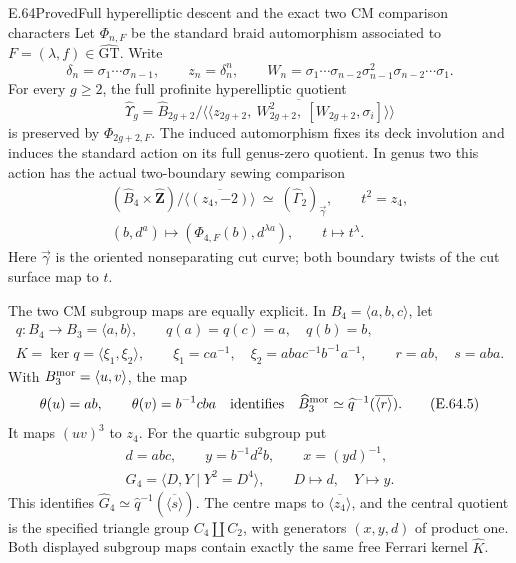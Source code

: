 \begin{statement}{E.64}{Proved}{Full hyperelliptic descent and the exact two CM comparison characters}
Let $\Phi_{n,F}$ be the standard braid automorphism associated to
$F=(\lambda,f)\in\widehat{\mathrm{GT}}$.  Write
\[
 \delta_n=\sigma_1\cdots\sigma_{n-1},\qquad z_n=\delta_n^n,
 \qquad
 W_n=\sigma_1\cdots\sigma_{n-2}\sigma_{n-1}^2
                         \sigma_{n-2}\cdots\sigma_1.
 \tag{E.64.1}
\]
For every $g\geq2$, the full profinite hyperelliptic quotient
\[
 \widehat\Upsilon_g=
 \widehat B_{2g+2}/
 \overline{\langle\!\langle
 z_{2g+2},\ W_{2g+2}^2,\ [W_{2g+2},\sigma_i]
 \rangle\!\rangle}
 \tag{E.64.2}
\]
is preserved by $\Phi_{2g+2,F}$.  The induced automorphism fixes its
deck involution and induces the standard action on its full
genus-zero quotient.  In genus two this action has the actual
two-boundary sewing comparison
\[
 \begin{gathered}
 (\widehat B_4\times\widehat{\mathbf Z})/
                   \overline{\langle(z_4,-2)\rangle}
       \ \simeq\ (\widehat\Gamma_2)_{\vec\gamma},
       \qquad t^2=z_4,\\
 (b,d^a)\longmapsto
                (\Phi_{4,F}(b),d^{\lambda a}),
       \qquad t\longmapsto t^\lambda .
 \end{gathered}
 \tag{E.64.3}
\]
Here $\vec\gamma$ is the oriented nonseparating cut curve; both
boundary twists of the cut surface map to $t$.

The two CM subgroup maps are equally explicit.  In
$B_4=\langle a,b,c\rangle$, let
\[
 \begin{gathered}
 q:B_4\longrightarrow B_3=\langle a,b\rangle,
       \qquad q(a)=q(c)=a,\quad q(b)=b,\\
 K=\ker q=\langle\xi_1,\xi_2\rangle,\qquad
 \xi_1=ca^{-1},\quad
 \xi_2=aba c^{-1}b^{-1}a^{-1},\qquad r=ab,
       \quad s=aba .
 \end{gathered}
 \tag{E.64.4}
\]
With $B_3^{\rm mor}=\langle u,v\rangle$, the map
\[
 \theta(u)=ab,\qquad \theta(v)=b^{-1}cba
 \quad\text{identifies}\quad
 \widehat B_3^{\rm mor}\simeq
             \widehat q^{-1}(\overline{\langle r\rangle}).
 \tag{E.64.5}
\]
It maps $(uv)^3$ to $z_4$.  For the quartic subgroup put
\[
 \begin{gathered}
 d=abc,\qquad y=b^{-1}d^2b,\qquad x=(yd)^{-1},\\
 G_4=\langle D,Y\mid Y^2=D^4\rangle,
       \qquad D\mapsto d,\quad Y\mapsto y.
 \end{gathered}
 \tag{E.64.6}
\]
This identifies
$\widehat G_4\simeq\widehat q^{-1}(\overline{\langle s\rangle})$.
The centre maps to $\overline{\langle z_4\rangle}$, and the
central quotient is the specified triangle group
$C_4\amalg C_2$, with generators $(x,y,d)$ of product one.
Both displayed subgroup maps contain exactly the same free
Ferrari kernel $\widehat K$.


\end{statement}
